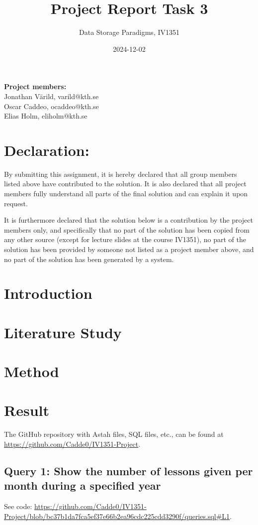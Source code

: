 \documentclass[a4paper]{scrartcl}
\title{Project Report Task 3}
\subtitle{Data Storage Paradigms, IV1351}
\author{}
\date{2024-12-02}
\begin{document}
\maketitle
\noindent\textbf{Project members:} \\ \hfill
Jonathan Värild, varild@kth.se \\ \hfill
Oscar Caddeo, ocaddeo@kth.se \\ \hfill
Elias Holm, eliholm@kth.se \\ \hfill

\section*{Declaration:}

By submitting this assignment, it is hereby declared that all group members listed above have contributed to the solution. It is also declared that all project members fully understand all parts of the final solution and can explain it upon request.

It is furthermore declared that the solution below is a contribution by the project members only, and specifically that no part of the solution has been copied from any other source (except for lecture slides at the course IV1351), no part of the solution has been provided by someone not listed as a project member above, and no part of the solution has been generated by a system.

\section{Introduction}


\section{Literature Study}


\section{Method}


\section{Result}

The GitHub repository with Astah files, SQL files, etc., can be found at \url{https://github.com/Cadde0/IV1351-Project}.

\subsection{Query 1: Show the number of lessons given per month during a specified year}
See code: \url{https://github.com/Cadde0/IV1351-Project/blob/bc37b1da7fca5ef37e66b2ea96cdc225cdd3290f/queries.sql#L1}.
\end{document}

